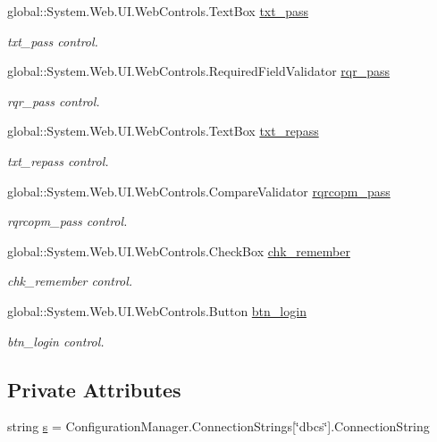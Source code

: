 \begin{DoxyCompactItemize}
global\+::\+System.\+Web.\+U\+I.\+Web\+Controls.\+Text\+Box \mbox{\hyperlink{class_admin__login_a373c449844031a6675ec4543b12673e8}{txt\+\_\+pass}}
\begin{DoxyCompactList}\small\item\em txt\+\_\+pass control. \end{DoxyCompactList}\item 
global\+::\+System.\+Web.\+U\+I.\+Web\+Controls.\+Required\+Field\+Validator \mbox{\hyperlink{class_admin__login_ab783b862cb4a762bb7520ca6319e8972}{rqr\+\_\+pass}}
\begin{DoxyCompactList}\small\item\em rqr\+\_\+pass control. \end{DoxyCompactList}\item 
global\+::\+System.\+Web.\+U\+I.\+Web\+Controls.\+Text\+Box \mbox{\hyperlink{class_admin__login_a39649da655a43a91592bb818f05ead62}{txt\+\_\+repass}}
\begin{DoxyCompactList}\small\item\em txt\+\_\+repass control. \end{DoxyCompactList}\item 
global\+::\+System.\+Web.\+U\+I.\+Web\+Controls.\+Compare\+Validator \mbox{\hyperlink{class_admin__login_a417f96c2085915593a4a041488afabfb}{rqrcopm\+\_\+pass}}
\begin{DoxyCompactList}\small\item\em rqrcopm\+\_\+pass control. \end{DoxyCompactList}\item 
global\+::\+System.\+Web.\+U\+I.\+Web\+Controls.\+Check\+Box \mbox{\hyperlink{class_admin__login_ae8bcce72339c8924b596ad8f7334e919}{chk\+\_\+remember}}
\begin{DoxyCompactList}\small\item\em chk\+\_\+remember control. \end{DoxyCompactList}\item 
global\+::\+System.\+Web.\+U\+I.\+Web\+Controls.\+Button \mbox{\hyperlink{class_admin__login_a8c186b94aacef68548f1149242e2bf99}{btn\+\_\+login}}
\begin{DoxyCompactList}\small\item\em btn\+\_\+login control. \end{DoxyCompactList}\end{DoxyCompactItemize}
\subsection*{Private Attributes}
\begin{DoxyCompactItemize}
\item 
string \mbox{\hyperlink{class_admin__login_a88c4984bf54e0aeaa4a27e3f24540da0}{s}} = Configuration\+Manager.\+Connection\+Strings\mbox{[}\char`\"{}dbcs\char`\"{}\mbox{]}.Connection\+String
\end{DoxyCompactItemize}


